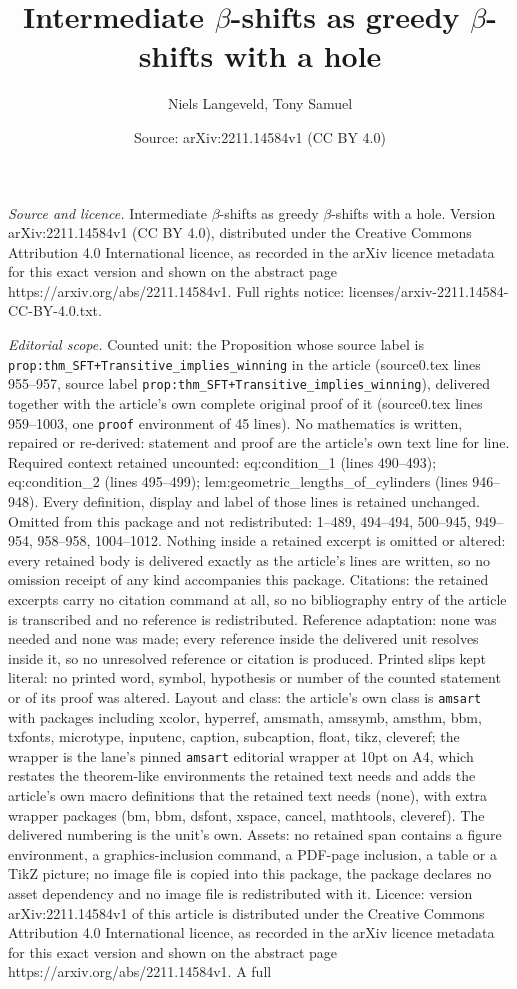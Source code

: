 \documentclass[10pt,a4paper]{amsart}
\title[Intermediate $\beta$-shifts as greedy $\beta$-shifts with a ]{Intermediate $\beta$-shifts as greedy $\beta$-shifts with a hole}
\author{Niels Langeveld, Tony Samuel}
\date{Source: arXiv:2211.14584v1 (CC BY 4.0)}
\begin{document}
\maketitle

\noindent\emph{Source and licence.} Intermediate $\beta$-shifts as greedy $\beta$-shifts with a hole. Version arXiv:2211.14584v1 (CC BY 4.0), distributed under the Creative Commons Attribution 4.0 International licence, as recorded in the arXiv licence metadata for this exact version and shown on the abstract page https://arxiv.org/abs/2211.14584v1. Full rights notice: licenses/arxiv-2211.14584-CC-BY-4.0.txt.\par\smallskip

\noindent\textit{Editorial scope.} Counted unit: the Proposition whose source label is \texttt{prop:thm\_SFT+Transitive\_implies\_winning} in the article (source0.tex lines 955--957, source label \texttt{prop:thm\_SFT+Transitive\_implies\_winning}), delivered together with the article's own complete original proof of it (source0.tex lines 959--1003, one \texttt{proof} environment of 45 lines). No mathematics is written, repaired or re-derived: statement and proof are the article's own text line for line. Required context retained uncounted: eq:condition\_1 (lines 490--493); eq:condition\_2 (lines 495--499); lem:geometric\_lengths\_of\_cylinders (lines 946--948). Every definition, display and label of those lines is retained unchanged. Omitted from this package and not redistributed: 1--489, 494--494, 500--945, 949--954, 958--958, 1004--1012. Nothing inside a retained excerpt is omitted or altered: every retained body is delivered exactly as the article's lines are written, so no omission receipt of any kind accompanies this package. Citations: the retained excerpts carry no citation command at all, so no bibliography entry of the article is transcribed and no reference is redistributed. Reference adaptation: none was needed and none was made; every reference inside the delivered unit resolves inside it, so no unresolved reference or citation is produced. Printed slips kept literal: no printed word, symbol, hypothesis or number of the counted statement or of its proof was altered. Layout and class: the article's own class is \texttt{amsart} with packages including xcolor, hyperref, amsmath, amssymb, amsthm, bbm, txfonts, microtype, inputenc, caption, subcaption, float, tikz, cleveref; the wrapper is the lane's pinned \texttt{amsart} editorial wrapper at 10pt on A4, which restates the theorem-like environments the retained text needs and adds the article's own macro definitions that the retained text needs (none), with extra wrapper packages (bm, bbm, dsfont, xspace, cancel, mathtools, cleveref). The delivered numbering is the unit's own. Assets: no retained span contains a figure environment, a graphics-inclusion command, a PDF-page inclusion, a table or a TikZ picture; no image file is copied into this package, the package declares no asset dependency and no image file is redistributed with it. Licence: version arXiv:2211.14584v1 of this article is distributed under the Creative Commons Attribution 4.0 International licence, as recorded in the arXiv licence metadata for this exact version and shown on the abstract page https://arxiv.org/abs/2211.14584v1. A full 
\end{document}
